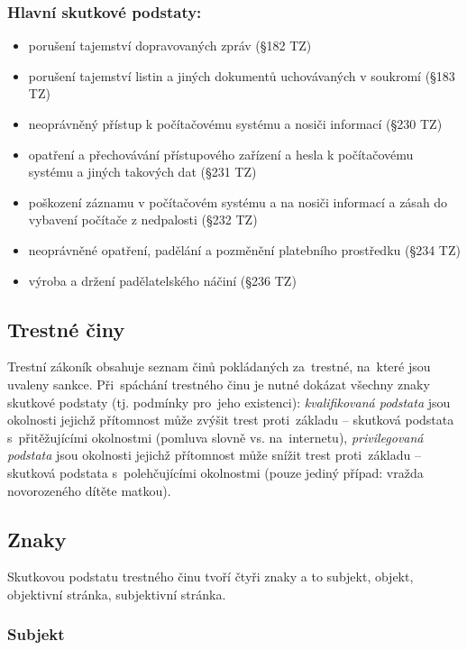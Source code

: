 \subsubsection{Hlavní skutkové podstaty:}
\begin{itemize}
    \item porušení tajemství dopravovaných zpráv (§182 TZ)
    \item porušení tajemství listin a jiných dokumentů uchovávaných v soukromí (§183 TZ)
    \item neoprávněný přístup k počítačovému systému a nosiči informací (§230 TZ)
    \item opatření a přechovávání přístupového zařízení a hesla k počítačovému systému a jiných takových dat (§231 TZ)
    \item poškození záznamu v počítačovém systému a na nosiči informací a zásah do vybavení počítače z nedpalosti (§232 TZ)
    \item neoprávněné opatření, padělání a pozměnění platebního prostředku (§234 TZ)
    \item výroba a držení padělatelského náčiní (§236 TZ)
\end{itemize}


\subsection{Trestné činy}

Trestní zákoník obsahuje seznam činů pokládaných za~trestné, na~které jsou uvaleny sankce.
Při~spáchání trestného činu je nutné dokázat všechny znaky skutkové podstaty (tj. podmínky pro~jeho existenci):
\emph{kvalifikovaná podstata} jsou okolnosti jejichž přítomnost může zvýšit trest proti~základu -- skutková podstata s~přitěžujícími okolnostmi (pomluva slovně vs. na~internetu),
\emph{privilegovaná podstata} jsou okolnosti jejichž přítomnost může snížit trest proti~základu --skutková podstata s~polehčujícími okolnostmi (pouze jediný případ: vražda novorozeného dítěte matkou).

\subsection{Znaky}

Skutkovou podstatu trestného činu tvoří čtyři znaky a to subjekt, objekt, objektivní stránka, subjektivní stránka.

\subsubsection{Subjekt}

